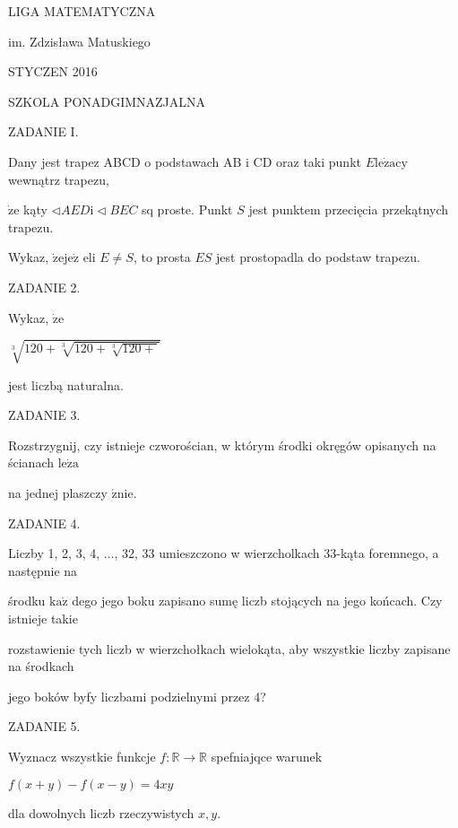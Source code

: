 \documentclass[a4paper,12pt]{article}
\begin{document}
LIGA MATEMATYCZNA

im. Zdzisława Matuskiego

STYCZEN 2016

SZKOLA PONADGIMNAZJALNA

ZADANIE I.

Dany jest trapez ABCD o podstawach AB $\mathrm{i}$ CD oraz taki punkt $E\mathrm{l}\mathrm{e}\dot{\mathrm{z}}\mathrm{a}\mathrm{c}\mathrm{y}$ wewnątrz trapezu,

$\dot{\mathrm{z}}\mathrm{e}$ kąty $\triangleleft AED \mathrm{i} \triangleleft BEC$ sq proste. Punkt $S$ jest punktem przecięcia przekątnych trapezu.

Wykaz, $\dot{\mathrm{z}}\mathrm{e}\mathrm{j}\mathrm{e}\dot{\mathrm{z}}$ eli $E\neq S$, to prosta $ES$ jest prostopadla do podstaw trapezu.

ZADANIE 2.

Wykaz, $\dot{\mathrm{z}}\mathrm{e}$

$\sqrt[3]{120+\sqrt[3]{120+\sqrt[3]{120+}}}$

jest liczbą naturalna.

ZADANIE 3.

Rozstrzygnij, czy istnieje czworościan, w którym środki okręgów opisanych na ścianach $\mathrm{l}\mathrm{e}\dot{\mathrm{z}}\mathrm{a}$

na jednej plaszczy $\acute{\mathrm{z}}\mathrm{n}\mathrm{i}\mathrm{e}.$

ZADANIE 4.

Liczby 1, 2, 3, 4, $\ldots$, 32, 33 umieszczono w wierzcholkach 33-kąta foremnego, a następnie na

środku $\mathrm{k}\mathrm{a}\dot{\mathrm{z}}$ dego jego boku zapisano sumę liczb stojących na jego końcach. Czy istnieje takie

rozstawienie tych liczb w wierzchołkach wielokąta, aby wszystkie liczby zapisane na środkach

jego boków byfy liczbami podzielnymi przez 4?

ZADANIE 5.

Wyznacz wszystkie funkcje $f:\mathbb{R}\rightarrow \mathbb{R}$ spefniajqce warunek

$f(x+y)-f(x-y)=4xy$

dla dowolnych liczb rzeczywistych $x, y.$
\end{document}
